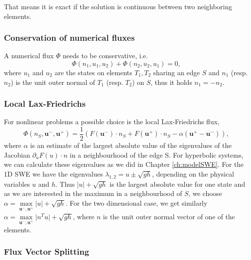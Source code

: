 \documentclass[a4paper,12pt]{article}
\theoremstyle{definition}
\theoremstyle{definition}
\begin{document}
That means it is exact if the solution is continuous between two neighboring elements.

\subsubsection*{Conservation of numerical fluxes}
A numerical flux $\Phi$ needs to be conservative, i.e. 
\begin{equation}
\Phi(n_1,u_1,u_2) + \Phi(n_2, u_2, u_1) = 0,
\end{equation}
where $u_1$ and $u_2$ are the states on elements $T_1, T_2$ sharing an edge $S$ and $n_1$ (resp. $n_2$) is the unit outer normal of $T_1$ (resp. $T_2$) on $S$, thus it holds $n_1 = -n_2$. 

\subsubsection{Local Lax-Friedrichs}

For nonlinear problems a possible choice is the local Lax-Friedrichs flux, 
\begin{equation}
\Phi (n_S, \mathbf{u}^-, \mathbf{u}^+) = \frac{1}{2}(F(\mathbf{u}^-)\cdot n_S + F(\mathbf{u}^+)\cdot n_S - \alpha (\mathbf{u}^+ -\mathbf{u}^- )),
\end{equation}
where $\alpha$ is an estimate of the largest absolute value of the eigenvalues of the Jacobian $\partial_u F(u)\cdot n$ in a neighbourhood of the edge S.
For hyperbolic systems, we can calculate these eigenvalues as we did in Chapter \ref{ch:modelSWE}.
For the 1D SWE we have the eigenvalues $\lambda_{1,2} = u \pm \sqrt{gh}$, depending on the physical variables $u$ and $h$.
Thus $\vert u \vert +\sqrt{gh}$ is the largest absolute value for one state and as we are interested in the maximum in a neighbourhood of $S$, we choose $\alpha = \max\limits_{\mathbf{u}^-, \mathbf{u}^+} \vert u \vert +\sqrt{gh}$.
For the two dimensional case, we get similarly $\alpha = \max\limits_{\mathbf{u}^-, \mathbf{u}^+} \vert n^Tu \vert +\sqrt{gh}$, where $n$ is the unit outer normal vector of one of the elements.


\subsubsection{Flux Vector Splitting}
\end{document}
